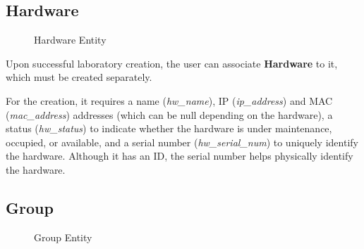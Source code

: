 \subsection*{Hardware}

\begin{figure}[H]
    \begin{center}
    \end{center}
    \caption{Hardware Entity}
    \label{fig:hardware_entity}
\end{figure}

Upon successful laboratory creation, the user can associate \textbf{Hardware} to it, which must be created separately.

For the creation, it requires a name (\textit{hw\_name}), IP (\textit{ip\_address}) and MAC (\textit{mac\_address}) addresses (which can be null depending on the hardware), a status (\textit{hw\_status}) to indicate whether the hardware is under maintenance, occupied, or available, and a serial number (\textit{hw\_serial\_num}) to uniquely identify the hardware. Although it has an ID, the serial number helps physically identify the hardware.    

\subsection*{Group}

\begin{figure}[h]
    \begin{center}
    \end{center}
    \caption{Group Entity}
    \label{fig:group_entity}
\end{figure}

